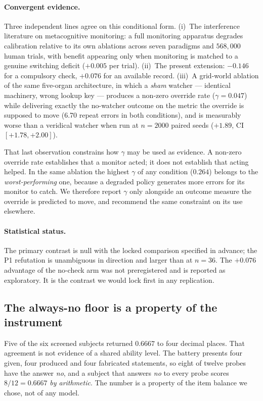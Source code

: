 \documentclass[11pt]{article}
\begin{document}
\paragraph{Convergent evidence.} Three independent lines agree on this
conditional form. (i)~The interference literature on metacognitive
monitoring: a full monitoring apparatus degrades calibration relative to
its own ablations across seven paradigms and $568{,}000$ human trials,
with benefit appearing only when monitoring is matched to a genuine
switching deficit ($+0.005$ per trial). (ii)~The present extension:
$-0.146$ for a compulsory check, $+0.076$ for an available record.
(iii)~A grid-world ablation of the same five-organ architecture, in which a
\emph{sham} watcher --- identical machinery, wrong lookup key --- produces
a non-zero override rate ($\gamma = 0.047$) while delivering exactly the
no-watcher outcome on the metric the override is supposed to move
(6.70 repeat errors in both conditions), and is measurably worse than a
veridical watcher when run at $n=2000$ paired seeds
($+1.89$, CI $[+1.78, +2.00]$).

That last observation constrains how $\gamma$ may be used as evidence.
A non-zero override rate establishes that a monitor acted; it does not
establish that acting helped. In the same ablation the highest $\gamma$ of
any condition ($0.264$) belongs to the \emph{worst-performing} one, because
a degraded policy generates more errors for its monitor to catch. We
therefore report $\gamma$ only alongside an outcome measure the override is
predicted to move, and recommend the same constraint on its use elsewhere.

\paragraph{Statistical status.} The primary contrast is null with the
locked comparison specified in advance; the P1 refutation is unambiguous in
direction and larger than at $n=36$. The $+0.076$ advantage of the
no-check arm was not preregistered and is reported as exploratory. It is
the contrast we would lock first in any replication.

\subsection{The always-no floor is a property of the instrument}
\label{sec:floor}

Five of the six screened subjects returned $0.6667$ to four decimal places.
That agreement is not evidence of a shared ability level. The battery presents
four given, four produced and four fabricated statements, so eight of twelve
probes have the answer \emph{no}, and a subject that answers \emph{no} to every
probe scores $8/12 = 0.6667$ \emph{by arithmetic}. The number is a property of
the item balance we chose, not of any model.
\end{document}
